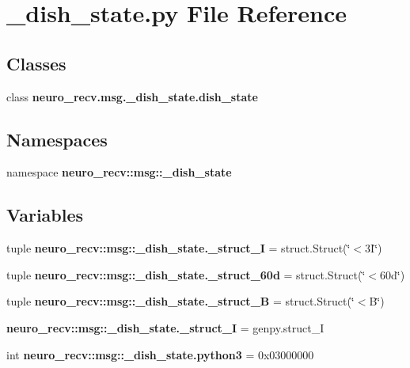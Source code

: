 \section{\-\_\-dish\-\_\-state.\-py \-File \-Reference}
\label{__dish__state_8py}
\subsection*{\-Classes}
\begin{DoxyCompactItemize}
\item 
class {\bf neuro\-\_\-recv.\-msg.\-\_\-dish\-\_\-state.\-dish\-\_\-state}
\end{DoxyCompactItemize}
\subsection*{\-Namespaces}
\begin{DoxyCompactItemize}
\item 
namespace {\bf neuro\-\_\-recv\-::msg\-::\-\_\-dish\-\_\-state}
\end{DoxyCompactItemize}
\subsection*{\-Variables}
\begin{DoxyCompactItemize}
\item 
tuple {\bf neuro\-\_\-recv\-::msg\-::\-\_\-dish\-\_\-state.\-\_\-struct\-\_\-I} = struct.\-Struct(\char`\"{}$<$3\-I\char`\"{})
\item 
tuple {\bf neuro\-\_\-recv\-::msg\-::\-\_\-dish\-\_\-state.\-\_\-struct\-\_\-60d} = struct.\-Struct(\char`\"{}$<$60d\char`\"{})
\item 
tuple {\bf neuro\-\_\-recv\-::msg\-::\-\_\-dish\-\_\-state.\-\_\-struct\-\_\-\-B} = struct.\-Struct(\char`\"{}$<$\-B\char`\"{})
\item 
{\bf neuro\-\_\-recv\-::msg\-::\-\_\-dish\-\_\-state.\-\_\-struct\-\_\-\-I} = genpy.\-struct\-\_\-\-I
\item 
int {\bf neuro\-\_\-recv\-::msg\-::\-\_\-dish\-\_\-state.\-python3} = 0x03000000
\end{DoxyCompactItemize}
